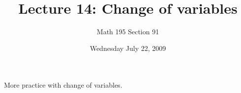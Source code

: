 \documentclass[12pt]{article}
\title{Lecture 14: Change of variables}
\author{Math 195 Section 91}
\date{Wednesday July 22, 2009}
\begin{document}
\maketitle

More practice with change of variables.
\end{document}
